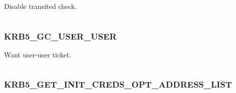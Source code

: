 \documentclass[letterpaper,10pt,english]{sphinxmanual}
\begin{document}
\begin{fulllineitems}
\label{appdev/refs/macros/KRB5_GC_NO_TRANSIT_CHECK:KRB5_GC_NO_TRANSIT_CHECK}
\end{fulllineitems}


Disable transited check.

\begin{tabulary}{\linewidth}{|L|L|}
\hline

 & 
\\\hline
\end{tabulary}



\subsubsection{KRB5\_GC\_USER\_USER}
\label{appdev/refs/macros/KRB5_GC_USER_USER::doc}\label{appdev/refs/macros/KRB5_GC_USER_USER:krb5-gc-user-user}\label{appdev/refs/macros/KRB5_GC_USER_USER:krb5-gc-user-user-data}

\begin{fulllineitems}
\label{appdev/refs/macros/KRB5_GC_USER_USER:KRB5_GC_USER_USER}
\end{fulllineitems}


Want user-user ticket.

\begin{tabulary}{\linewidth}{|L|L|}
\hline

 & 
\\\hline
\end{tabulary}



\subsubsection{KRB5\_GET\_INIT\_CREDS\_OPT\_ADDRESS\_LIST}
\label{appdev/refs/macros/KRB5_GET_INIT_CREDS_OPT_ADDRESS_LIST:krb5-get-init-creds-opt-address-list}\label{appdev/refs/macros/KRB5_GET_INIT_CREDS_OPT_ADDRESS_LIST::doc}\label{appdev/refs/macros/KRB5_GET_INIT_CREDS_OPT_ADDRESS_LIST:krb5-get-init-creds-opt-address-list-data}

\begin{fulllineitems}
\label{appdev/refs/macros/KRB5_GET_INIT_CREDS_OPT_ADDRESS_LIST:KRB5_GET_INIT_CREDS_OPT_ADDRESS_LIST}
\end{fulllineitems}
\end{document}
